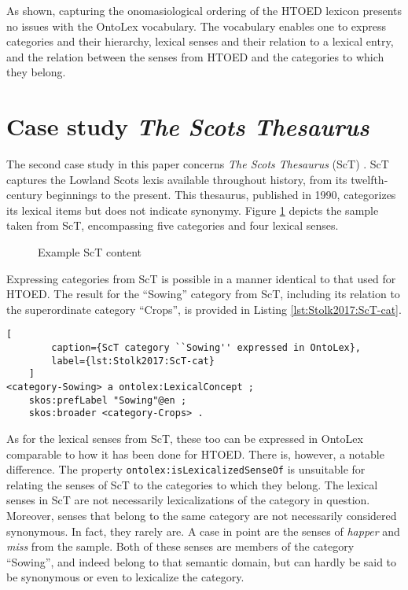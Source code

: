 As shown, capturing the onomasiological ordering of the HTOED lexicon presents no issues with the OntoLex vocabulary. The vocabulary enables one to express categories and their hierarchy, lexical senses and their relation to a lexical entry, and the relation between the senses from HTOED and the categories to which they belong.


\section{Case study \textit{The Scots Thesaurus}}

The second case study in this paper concerns \textit{The Scots Thesaurus} (ScT) \cite{macleod_scots_1990}. ScT captures the Lowland Scots lexis available throughout history, from its twelfth-century beginnings to the present. This thesaurus, published in 1990, categorizes its lexical items but does not indicate synonymy. Figure \ref{fig:Stolk2017:ScT} depicts the sample taken from ScT, encompassing five categories and four lexical senses.

\begin{figure}[htbp]
	\framebox[\textwidth]{
		\scalebox{0.65}[0.65]{
			
		}
	}
	\caption[]{\label{fig:Stolk2017:ScT} Example ScT content}
\end{figure}

Expressing categories from ScT is possible in a manner identical to that used for HTOED. The result for the ``Sowing'' category from ScT, including its relation to the superordinate category ``Crops'', is provided in Listing \ref{lst:Stolk2017:ScT-cat}.

\noindent
\begin{minipage}[c]{\textwidth}
	\begin{lstlisting}[
		caption={ScT category ``Sowing'' expressed in OntoLex},
		label={lst:Stolk2017:ScT-cat}
	]
<category-Sowing> a ontolex:LexicalConcept ;
	skos:prefLabel "Sowing"@en ;
	skos:broader <category-Crops> .
	\end{lstlisting}
\end{minipage}

As for the lexical senses from ScT, these too can be expressed in OntoLex comparable to how it has been done for HTOED. There is, however, a notable difference. The property \texttt{ontolex:isLexicalizedSenseOf} is unsuitable for relating the senses of ScT to the categories to which they belong. The lexical senses in ScT are not necessarily lexicalizations of the category in question. Moreover, senses that belong to the same category are not necessarily considered synonymous. In fact, they rarely are. A case in point are the senses of \textit{happer} and \textit{miss} from the sample. Both of these senses are members of the category ``Sowing'', and indeed belong to that semantic domain, but can hardly be said to be synonymous or even to lexicalize the category.

